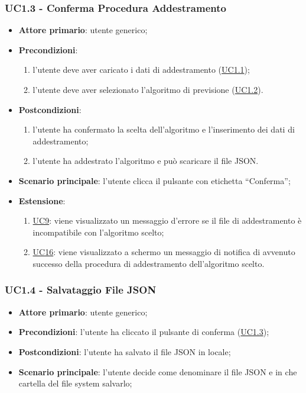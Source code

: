 	\subsubsection{UC1.3 - Conferma Procedura Addestramento}
		\begin{itemize}
			\item\textbf{Attore primario}: utente generico;
			\item\textbf{Precondizioni}:
				\begin{enumerate}
					\item l’utente deve aver caricato i dati di addestramento (\hyperref[par:UC1.1]{UC1.1});
					\item l’utente deve aver selezionato l’algoritmo di previsione (\hyperref[par:UC1.2]{UC1.2}).
				\end{enumerate}
			\item\textbf{Postcondizioni}:
				\begin{enumerate}
					\item l’utente ha confermato la scelta dell’algoritmo e l’inserimento dei dati di addestramento;
					\item l'utente ha addestrato l'algoritmo e può scaricare il file JSON.
				\end{enumerate}
			\item\textbf{Scenario principale}: l’utente clicca il pulsante con etichetta “Conferma”;
			\item\textbf{Estensione}:
					\begin{enumerate}
						\item\hyperref[par:UC9]{UC9}: viene visualizzato un messaggio d’errore se il file di addestramento è incompatibile con l’algoritmo scelto; 	
						\item\hyperref[par:UC16]{UC16}: viene visualizzato a schermo un messaggio di notifica di avvenuto successo della procedura di addestramento dell’algoritmo scelto.	
					\end{enumerate}
		\end{itemize}

	\label{par:UC1.4}
	\subsubsection{UC1.4 - Salvataggio File JSON}
		\begin{itemize}
			\item\textbf{Attore primario}: utente generico;
			\item\textbf{Precondizioni}: l’utente ha cliccato il pulsante di conferma (\hyperref[par:UC1.3]{UC1.3});
			\item\textbf{Postcondizioni}: l’utente ha salvato il file JSON in locale;
			\item\textbf{Scenario principale}: l’utente decide come denominare il file JSON e in che cartella del file system salvarlo; 		
		\end{itemize}

